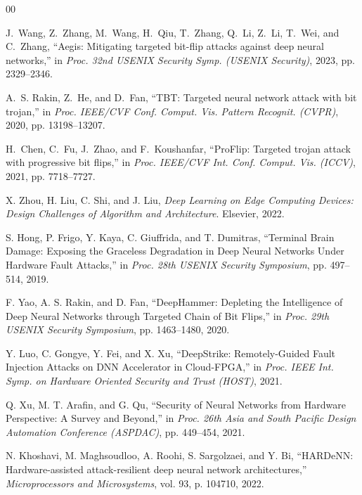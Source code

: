 \documentclass[conference,10pt]{IEEEtran}
\begin{document}
\begin{thebibliography}{00}

J.~Wang, Z.~Zhang, M.~Wang, H.~Qiu, T.~Zhang, Q.~Li, Z.~Li, T.~Wei, and C.~Zhang, ``Aegis: Mitigating targeted bit-flip attacks against deep neural networks,'' in \textit{Proc. 32nd USENIX Security Symp. (USENIX Security)}, 2023, pp. 2329--2346.

A.~S. Rakin, Z.~He, and D.~Fan, ``TBT: Targeted neural network attack with bit trojan,'' in \textit{Proc. IEEE/CVF Conf. Comput. Vis. Pattern Recognit. (CVPR)}, 2020, pp. 13198--13207.

H.~Chen, C.~Fu, J.~Zhao, and F.~Koushanfar, ``ProFlip: Targeted trojan attack with progressive bit flips,'' in \textit{Proc. IEEE/CVF Int. Conf. Comput. Vis. (ICCV)}, 2021, pp. 7718--7727.

X. Zhou, H. Liu, C. Shi, and J. Liu,
\textit{Deep Learning on Edge Computing Devices: Design Challenges of Algorithm and Architecture}.
Elsevier, 2022.


S. Hong, P. Frigo, Y. Kaya, C. Giuffrida, and T. Dumitras,
``Terminal Brain Damage: Exposing the Graceless Degradation in Deep Neural Networks Under Hardware Fault Attacks,''
in \textit{Proc. 28th USENIX Security Symposium}, pp. 497--514, 2019.

F. Yao, A. S. Rakin, and D. Fan,
``DeepHammer: Depleting the Intelligence of Deep Neural Networks through Targeted Chain of Bit Flips,''
in \textit{Proc. 29th USENIX Security Symposium}, pp. 1463--1480, 2020.

Y. Luo, C. Gongye, Y. Fei, and X. Xu,
``DeepStrike: Remotely-Guided Fault Injection Attacks on DNN Accelerator in Cloud-FPGA,''
in \textit{Proc. IEEE Int. Symp. on Hardware Oriented Security and Trust (HOST)}, 2021.

Q. Xu, M. T. Arafin, and G. Qu,
``Security of Neural Networks from Hardware Perspective: A Survey and Beyond,''
in \textit{Proc. 26th Asia and South Pacific Design Automation Conference (ASPDAC)}, 
pp. 449--454, 2021.

N. Khoshavi, M. Maghsoudloo, A. Roohi, S. Sargolzaei, and Y. Bi,
``HARDeNN: Hardware-assisted attack-resilient deep neural network architectures,''
\textit{Microprocessors and Microsystems}, vol. 93, p. 104710, 2022.


\end{thebibliography}
\end{document}
